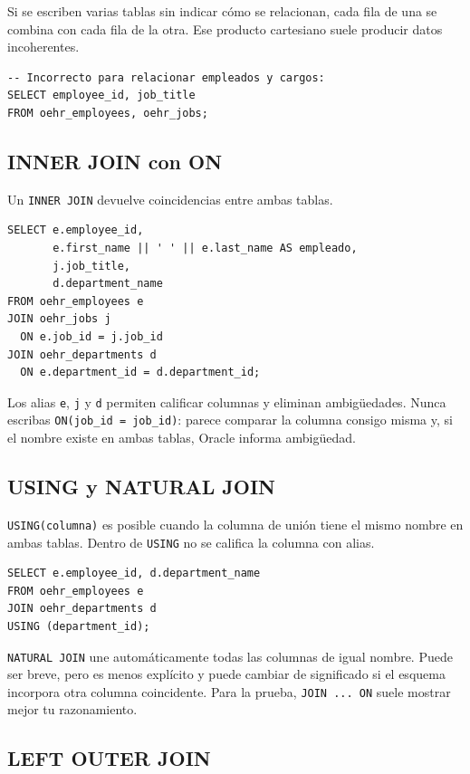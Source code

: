 \documentclass[11pt,a4paper]{article}
\newcommand{\campo}[1]{\texttt{#1}}
\begin{document}
Si se escriben varias tablas sin indicar cómo se relacionan, cada fila de una se combina con cada
fila de la otra. Ese producto cartesiano suele producir datos incoherentes.

\begin{lstlisting}
-- Incorrecto para relacionar empleados y cargos:
SELECT employee_id, job_title
FROM oehr_employees, oehr_jobs;
\end{lstlisting}

\subsection{INNER JOIN con ON}

Un \campo{INNER JOIN} devuelve coincidencias entre ambas tablas.

\begin{lstlisting}
SELECT e.employee_id,
       e.first_name || ' ' || e.last_name AS empleado,
       j.job_title,
       d.department_name
FROM oehr_employees e
JOIN oehr_jobs j
  ON e.job_id = j.job_id
JOIN oehr_departments d
  ON e.department_id = d.department_id;
\end{lstlisting}

Los alias \campo{e}, \campo{j} y \campo{d} permiten calificar columnas y eliminan ambigüedades.
Nunca escribas \campo{ON(job\_id = job\_id)}: parece comparar la columna consigo misma y, si el nombre
existe en ambas tablas, Oracle informa ambigüedad.

\subsection{USING y NATURAL JOIN}

\campo{USING(columna)} es posible cuando la columna de unión tiene el mismo nombre en ambas tablas.
Dentro de \campo{USING} no se califica la columna con alias.

\begin{lstlisting}
SELECT e.employee_id, d.department_name
FROM oehr_employees e
JOIN oehr_departments d
USING (department_id);
\end{lstlisting}

\campo{NATURAL JOIN} une automáticamente todas las columnas de igual nombre. Puede ser breve, pero
es menos explícito y puede cambiar de significado si el esquema incorpora otra columna coincidente.
Para la prueba, \campo{JOIN ... ON} suele mostrar mejor tu razonamiento.

\subsection{LEFT OUTER JOIN}
\end{document}
